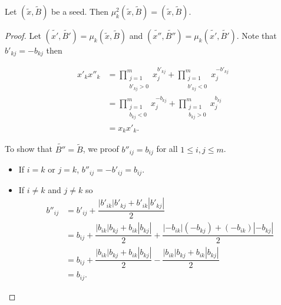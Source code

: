 \documentclass[10pt,a4paper]{amsart}
\begin{document}
\begin{Lemma}
Let $(\tilde{x},\tilde{B})$ be a seed. Then $\mu^2_k(\tilde{x},\tilde{B})=(\tilde{x},\tilde{B})$.
\label{lema1}
\end{Lemma}

\begin{proof}
Let $(\tilde{x'},\tilde{B'})=\mu_{k}(\tilde{x},\tilde{B})$ and $(\tilde{x''},\tilde{B''})=\mu_{k}(\tilde{x'},\tilde{B'})$. Note that $b'_{kj}=-b_{kj}$ then

$$\begin{array}{rl}
{x'}_k{x''}_k & = \prod^{m}_{\substack{j=1 \\ {b'}_{kj}>0}}{x}_{j}^{{b'}_{kj}}+ \prod^{m}_{\substack{j=1 \\ {b'}_{kj}<0}}{x}_{j}^{{-b'}_{kj}} \\
 & = \prod^{m}_{\substack{j=1 \\ {b}_{kj}<0}}{x}_{j}^{-{b}_{kj}}+ \prod^{m}_{\substack{j=1 \\ {b}_{kj}>0}}{x}_{j}^{{b}_{kj}} \\
 & = x_kx'_k.
\end{array}$$

To show that $\tilde{B''}=\tilde{B}$, we proof ${b''}_{ij}=b_{ij}$ for all $1\leq i,j \leq m$.

\begin{itemize}
\item If $i=k$ or $j=k$, ${b''}_{ij}=-{b'}_{ij}=b_{ij}$.
\item If $i\neq k$ and $j \neq k$ so
$$\begin{array}{rl}
{b''}_{ij} & = {b'}_{ij}+\dfrac{|{b'}_{ik}|{b'}_{kj}+{b'}_{ik}|{b'}_{kj}|}{2} \\
 & = b_{ij} + \dfrac{|b_{ik}|b_{kj}+b_{ik}|b_{kj}|}{2} + \dfrac{|-b_{ik}|(-b_{kj})+(-b_{ik})|-b_{kj}|}{2} \\
  & = b_{ij} + \dfrac{|b_{ik}|b_{kj}+b_{ik}|b_{kj}|}{2} - \dfrac{|b_{ik}|b_{kj}+b_{ik}|b_{kj}|}{2} \\
  & = b_{ij}.
\end{array}$$
\end{itemize}

\end{proof}
\end{document}
